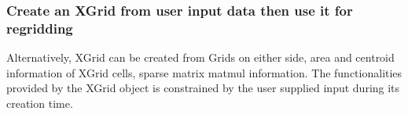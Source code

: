  
\setlength{\oldparskip}{\parskip}
\setlength{\parskip}{1.5ex}
\setlength{\oldparindent}{\parindent}
\setlength{\parindent}{0pt}
\setlength{\oldbaselineskip}{\baselineskip}
\setlength{\baselineskip}{11pt}
 
\def\bv{\begin{verbatim}}
\def\ev{\end{verbatim}}
\def\be{\begin{equation}}
\def\ee{\end{equation}}
\def\bea{\begin{eqnarray}}
\def\eea{\end{eqnarray}}
\def\bi{\begin{itemize}}
\def\ei{\end{itemize}}
\def\bn{\begin{enumerate}}
\def\en{\end{enumerate}}
\def\bd{\begin{description}}
\def\ed{\end{description}}
\def\({\left (}
\def\){\right )}
\def\[{\left [}
\def\]{\right ]}
\def\<{\left  \langle}
\def\>{\right \rangle}
\def\cI{{\cal I}}
\def\diag{\mathop{\rm diag}}
\def\tr{\mathop{\rm tr}}


 

  \subsubsection{Create an XGrid from user input data then use it for regridding}
  \label{sec:xgrid:usage:xgrid_createfromsparsemat}
  
   Alternatively, XGrid can be created from Grids on either side,
   area and centroid information of XGrid cells, sparse matrix matmul information.
   The functionalities provided by the
   XGrid object is constrained by the user supplied input during its creation time.
  
